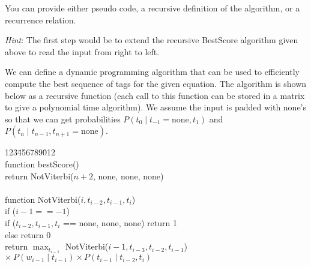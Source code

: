 \documentclass[11pt]{article}
\begin{document}
\begin{exe}
\begin{xlist}
{\bigskip

You can provide either pseudo code, a recursive definition of the algorithm, or
a recurrence relation.

\bigskip

{\em Hint}: The first step would be to extend the recursive BestScore algorithm given above 
to read the input from right to left.

\begin{soln}
We can define 
a dynamic programming algorithm that can be used to efficiently
compute the best sequence of tags for the given equation. The algorithm is shown below as a recursive
function (each call to this function can be stored in a matrix to
give a polynomial time algorithm). We assume the input is padded with none's so
that we can get probabilities
$P(t_0 \mid t_{-1} = \textrm{none}, t_1)$ and $P(t_n \mid t_{n-1}, t_{n+1} = \textrm{none})$.

\begin{tabbing}
123\=456\=789\=012 \kill \\
function bestScore() \\
\> return NotViterbi($n+2$, none, none, none) \\
\\
function NotViterbi($i, t_{i-2}, t_{i-1}, t_i$) \\
\> if ($i-1 == -1$) \\
\> \> if ($t_{i-2}, t_{i-1}, t_i$ == none, none, none) return 1 \\
\> \> else return 0 \\
\> return $\max_{t_{i-1}}$ NotViterbi($i-1, t_{i-3}, t_{i-2}, t_{i-1}$) $\times\ P(w_{i-1} \mid t_{i-1}) \times P(t_{i-1} \mid t_{i-2}, t_i)$
\end{tabbing}
\end{soln}
}

\end{xlist}

\end{exe}
\end{document}
